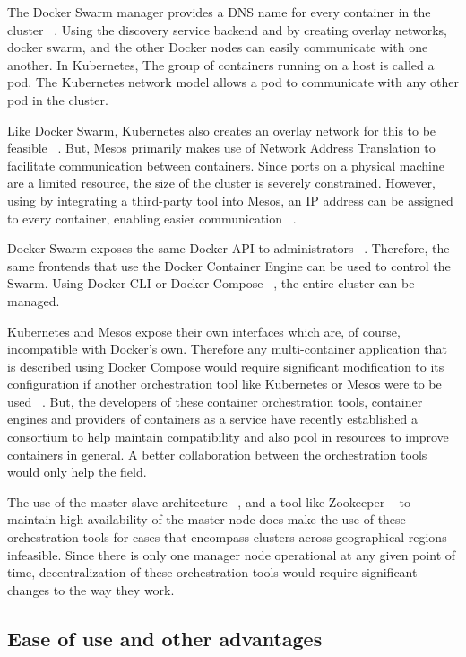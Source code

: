 \documentclass[10pt,twocolumn]{article}
\begin{document}
The Docker Swarm manager provides a DNS name for every container in the cluster ~\cite{intro_docker}.
Using the discovery service backend and by creating overlay networks, docker swarm, and the other Docker nodes can easily communicate with one another.
In Kubernetes, The group of containers running on a host is called a pod.
The Kubernetes network model allows a pod to communicate with any other pod in the cluster.

Like Docker Swarm, Kubernetes also creates an overlay network for this to be feasible ~\cite{platform9_dockerswarm_kubernetes}.
But, Mesos primarily makes use of Network Address Translation to facilitate communication between containers.
Since ports on a physical machine are a limited resource, the size of the cluster is severely constrained.
However, using by integrating a third-party tool into Mesos, an IP address can be assigned to every container, enabling easier communication ~\cite{platform9_mesos_kubernetes}.

Docker Swarm exposes the same Docker API to administrators ~\cite{docker_swarm}.
Therefore, the same frontends that use the Docker Container Engine can be used to control the Swarm.
Using Docker CLI or Docker Compose ~\cite{docker_compose}, the entire cluster can be managed.

Kubernetes and Mesos expose their own interfaces which are, of course, incompatible with Docker's own.
Therefore any multi-container application that is described using Docker Compose would require significant modification to its configuration if another orchestration tool like Kubernetes or Mesos were to be used ~\cite{kubernetes, mesos}.
But, the developers of these container orchestration tools, container engines and providers of containers as a service have recently established a consortium to help maintain compatibility and also pool in resources to improve containers in general.
A better collaboration between the orchestration tools would only help the field.

The use of the master-slave architecture ~\cite{docker_swarm, kubernetes, mesos}, and a tool like Zookeeper ~\cite{zookeeper} to maintain high availability of the master node does make the use of these orchestration tools for cases that encompass clusters across geographical regions infeasible.
Since there is only one manager node operational at any given point of time, decentralization of these orchestration tools would require significant changes to the way they work.


\subsection{Ease of use and other advantages}
\end{document}
